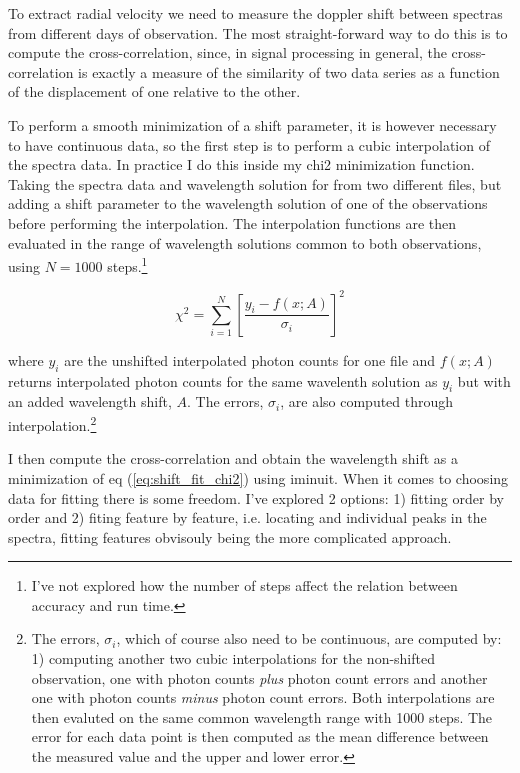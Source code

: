     To extract radial velocity we need to measure the doppler shift between spectras from different days of observation. The most straight-forward way to do this is to compute the cross-correlation, since, in signal processing in general, the cross-correlation is exactly a measure of the similarity of two data series as a function of the displacement of one relative to the other.

    To perform a smooth minimization of a shift parameter, it is however necessary to have continuous data, so the first step is to perform a cubic interpolation of the spectra data. In practice I do this inside my chi2 minimization function. Taking the spectra data and wavelength solution for from two different files, but adding a shift parameter to the wavelength solution of one of the observations before performing the interpolation. The interpolation functions are then evaluated in the range of wavelength solutions common to both observations, using $N=1000$ steps.\footnote{I've not explored how the number of steps affect the relation between accuracy and run time. }
    
    \begin{equation}
        \label{eq:shift_fit_chi2}
        \chi^{2}=\sum_{i=1}^{N}\left[\frac{y_{i}-f(x; A)}{\sigma_{i}}\right]^{2}
    \end{equation}
    
    where $y_i$ are the unshifted interpolated photon counts for one file and $f(x; A)$ returns interpolated photon counts for the same wavelenth solution as $y_i$ but with an added wavelength shift, $A$. The errors, $\sigma_i$, are also computed through interpolation.\footnote{The errors, $\sigma_i$, which of course also need to be continuous, are computed by: 1) computing another two cubic interpolations for the non-shifted observation, one with photon counts \emph{plus} photon count errors and another one with photon counts \emph{minus} photon count errors. Both interpolations are then evaluted on the same common wavelength range with 1000 steps. The error for each data point is then computed as the mean difference between the measured value and the upper and lower error.}
    
    I then compute the cross-correlation and obtain the wavelength shift as a minimization of eq (\ref{eq:shift_fit_chi2}) using iminuit. When it comes to choosing data for fitting there is some freedom. I've explored 2 options: 1) fitting order by order and 2) fiting feature by feature, i.e. locating and individual peaks in the spectra, fitting features obvisouly being the more complicated approach. 
    

